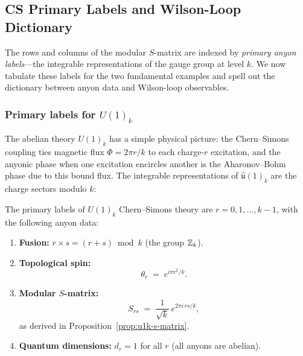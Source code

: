 \subsection{CS Primary Labels and Wilson-Loop Dictionary}
\label{subsec:cs-primary-labels}

The rows and columns of the modular $S$-matrix are indexed by \emph{primary
anyon labels}---the integrable representations of the gauge group at level $k$.
We now tabulate these labels for the two fundamental examples and spell out
the dictionary between anyon data and Wilson-loop observables.

\subsubsection*{Primary labels for $U(1)_k$}

The abelian theory $U(1)_k$ has a simple physical picture: the Chern--Simons
coupling ties magnetic flux $\Phi = 2\pi r/k$ to each charge-$r$ excitation,
and the anyonic phase when one excitation encircles another is the
Aharonov--Bohm phase due to this bound flux.  The integrable representations
of $\widehat{\mathfrak{u}}(1)_k$ are the charge sectors modulo $k$:

\begin{proposition}
\label{prop:u1k-anyon-data}
The primary labels of $U(1)_k$ Chern--Simons theory are
$r = 0, 1, \ldots, k-1$, with the following anyon data:
\begin{enumerate}
    \item \textbf{Fusion:}\; $r \times s = (r + s) \bmod k$
          \;\;(the group $\mathbb{Z}_k$).
    \item \textbf{Topological spin:}
\begin{equation}
\label{eq:u1k-topspin}
    \theta_r \;=\; e^{i\pi r^2/k}.
\end{equation}
    \item \textbf{Modular $S$-matrix:}
\begin{equation}
\label{eq:u1k-smatrix-repeat}
    S_{rs} \;=\; \frac{1}{\sqrt{k}}\, e^{2\pi i\, rs/k},
\end{equation}
          as derived in Proposition~\ref{prop:u1k-s-matrix}.
    \item \textbf{Quantum dimensions:}\; $d_r = 1$ for all $r$
          (all anyons are abelian).
\end{enumerate}
\end{proposition}

